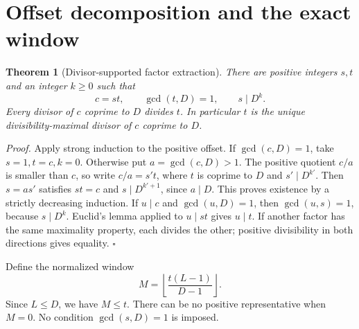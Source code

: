 \documentclass[11pt,letterpaper]{article}
\newtheorem{theorem}{Theorem}
\newenvironment{proof}{\noindent\textit{Proof.}}{\hfill\(\square\)}
\begin{document}
\section{Offset decomposition and the exact window}

\begin{theorem}[Divisor-supported factor extraction]
\label{thm:decomposition}
There are positive integers $s,t$ and an integer $k\ge0$ such that
\[
c=st,\qquad \gcd(t,D)=1,\qquad s\mid D^k.
\]
Every divisor of $c$ coprime to $D$ divides $t$. In particular $t$ is the
unique divisibility-maximal divisor of $c$ coprime to $D$.
\end{theorem}
\begin{proof}
Apply strong induction to the positive offset. If $\gcd(c,D)=1$, take
$s=1,t=c,k=0$. Otherwise put $a=\gcd(c,D)>1$. The positive quotient $c/a$
is smaller than $c$, so write $c/a=s't$, where $t$ is coprime to $D$ and
$s'\mid D^{k'}$. Then $s=as'$ satisfies $st=c$ and $s\mid D^{k'+1}$,
since $a\mid D$. This proves existence by a strictly decreasing induction.
If $u\mid c$ and $\gcd(u,D)=1$, then $\gcd(u,s)=1$, because $s\mid D^k$.
Euclid's lemma applied to $u\mid st$ gives $u\mid t$.
If another factor has the same maximality property, each divides the other;
positive divisibility in both directions gives equality.
\end{proof}

Define the normalized window
\[
M=\left\lfloor\frac{t(L-1)}{D-1}\right\rfloor.
\]
Since $L\le D$, we have $M\le t$. There can be no positive representative
when $M=0$. No condition $\gcd(s,D)=1$ is imposed.
\end{document}
